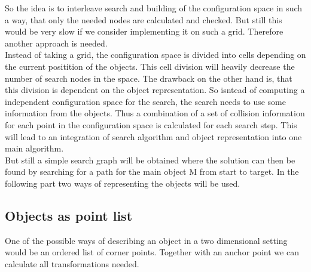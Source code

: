 So the idea is to interleave search and building of the configuration space in such a way, that only the needed nodes are calculated and checked.
But still this would be very slow if we consider implementing it on such a grid. Therefore another approach is needed.\\
Instead of taking a grid, the configuration space is divided into cells depending on the current positition of the objects. This cell division will heavily decrease the number of search nodes in the space. The drawback on the other hand is, that this division is dependent on the object representation. So isntead of computing a independent configuration space for the search, the search needs to use some information from the objects. Thus a combination of a set of collision information for each point in the configuration space is calculated for each search step. This will lead to an integration of search algorithm and object representation into one main algorithm.\\
But still a simple search graph will be obtained where the solution can then be found by searching for a path for the main object M from start to target. In the following part two ways of representing the objects will be used.


\subsection{Objects as point list}
\label{subsec::pointlist}
One of the possible ways of describing an object in a two dimensional setting would be an ordered list of corner points.  Together with an anchor point we can calculate all transformations needed.
